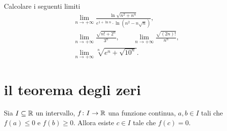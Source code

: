 \begin{exercise}
Calcolare i seguenti limiti
\begin{gather*}
  \lim_{n\to +\infty} \frac{\displaystyle \ln\sqrt{n^2+n^n}}
  {\displaystyle e^{1 + \ln n}\cdot \ln(n^2-n\sqrt n)}, \\
  \lim_{n\to +\infty} \frac{\sqrt{n! + 2^n}}{3^n}, \qquad
  \lim_{n\to +\infty} \frac{\sqrt{(2n)!}}{n^n}, \\
  \lim_{n\to +\infty} \sqrt[n]{e^n + \sqrt{10^n}}.
\end{gather*}
\end{exercise}

\section{il teorema degli zeri}

\begin{theorem}
\mymark{***}%
%
%
\label{th:zeri}%
Sia $I\subseteq \mathbb R$ un intervallo, $f\colon I \to \mathbb R$ una funzione
continua, $a,b\in I$ tali che $f(a)\le 0$ e $f(b)\ge 0$.
Allora esiste $c\in I$ tale che $f(c)=0$.
\end{theorem}

